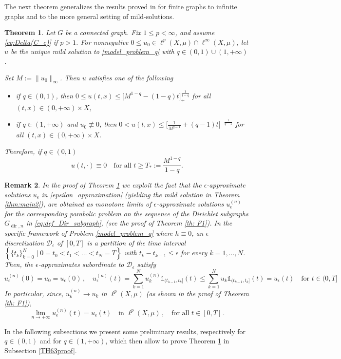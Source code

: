 \documentclass[journal]{article}
\newtheorem{theorem}{Theorem}[section]
\theoremstyle{nonitalic}
\theoremstyle{nonitalic}
\newtheorem{remark}[theorem]{Remark}
\theoremstyle{plain} %
\numberwithin{equation}{section}
\begin{document}
The next theorem  generalizes the  results proved in \cite{chung2011extinction} for finite graphs to infinite graphs and to the more general setting of mild-solutions.
\begin{theorem}\label{thm:extinction-infinite}
Let $G$ be a connected graph. Fix $1\le p<\infty$, and assume \eqref{eq:Delta(C_c)} if $p>1$. For nonnegative $0\leq u_0\in \ell^p(X,\mu)\cap \ell^\infty(X,\mu)$, let $u$ be the unique mild solution to \eqref{model_problem_q} with $q\in(0,1) \cup(1,+\infty)$.

Set $M:=\|u_0\|_{\infty}$. Then $u$ satisfies one of the following
\begin{itemize}
\item[1)] if $q\in(0,1)$, then $0\leq u(t,x) \leq \bigl[M^{1-q}-(1-q)t\bigr]_+^{\frac1{1-q}}$ for all $(t,x)\in (0,+\infty)\times X$, 

\item[2)] if $q\in(1,+\infty)$ and $u_0\not \equiv 0$, then
$ 0<u(t,x) \leq \bigl[\frac{1}{M^{q-1}}+(q-1)t\bigr]^{-\frac1{q-1}}$ for all $(t,x)\in (0,+\infty)\times X$.
\end{itemize}


Therefore, if $q\in (0,1)$
\[
u(t, \cdot)\equiv 0\quad\text{for all }t\ge T_\ast :=\dfrac{M^{1-q}}{1-q}.
\]
\end{theorem}



\begin{remark}\label{rem:construction_approximate_solutions}
    In the proof of Theorem \ref{thm:extinction-infinite} we exploit the fact that the $\epsilon$-approximate solutions $u_\epsilon$ in \eqref{epsilon_approximation} (yielding the mild solution in Theorem \ref{thm:main2}), are obtained as monotone limits of $\epsilon$-approximate solutions $u_\epsilon^{(n)}$ for the corresponding parabolic problem on the sequence of the Dirichlet subgraphs $G_{\operatorname{dir}, n}$ in \eqref{eq:def_Dir_subgraph}, (see the proof of Theorem \ref{th: F1}). In the specific framework of Problem \eqref{model_problem_q} where $h\equiv 0$, an $\epsilon$ discretization $\mathcal{D}_\epsilon$ of $[0,T]$ is a partition of the time interval
	$\left\{ \{t_k\}_{k=0}^N \mid 0= t_0<t_1<\ldots<t_N = T \right\}
	$ with $t_k-t_{k-1} \leq \epsilon$ for every $k=1,\ldots, N$.  Then, the $\epsilon$-approximates subordinate to $\mathcal{D}_\epsilon$ satisfy 
    $$u_\epsilon^{(n)}(0)=u_0=u_\epsilon(0)\,, \quad u_\epsilon^{(n)}(t) = \sum_{k=1}^N  u_k^{(n)}\mathds{1}_{(t_{k-1},t_k]}(t)\leq \sum_{k=1}^N  u_k\mathds{1}_{(t_{k-1},t_k]}(t)= u_\epsilon(t) \quad  \text{for } t\in(0,T]$$
    In particular, since, $u_k^{(n)} \to u_k$ in $\ell^p(X,\mu)$ (as shown in the proof of Theorem \ref{th: F1}),
    $$ \lim_{n \to + \infty} u_\epsilon^{(n)}(t)=u_\epsilon(t) \quad \text{in } \ell^p(X,\mu)\,,\quad  \text{for all } t \in [0,T]\,.$$
   
\end{remark}
In the following subsections we present some preliminary results, respectively for  $q\in(0,1)$  and for  $q\in(1,+\infty)$, which then allow to prove Theorem \ref{thm:extinction-infinite} in Subsection \ref{TH63proof}.
\end{document}
